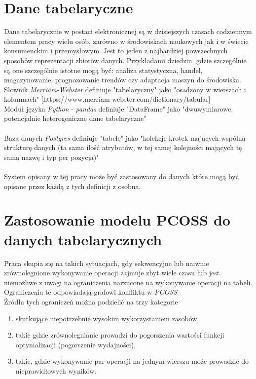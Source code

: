 \documentclass[brudnopis]{xmgr}
\begin{document}
\chapter{Dane tabelaryczne}

Dane tabelarycznie w postaci elektronicznej są w dzisiejszych czasach codziennym elementem pracy wielu osób, zarówno w środowiskach naukowych jak i w świecie konsumenckim i przemysłowym. Jest to jeden z najbardziej powszechnych sposobów reprezentacji zbiorów danych. Przykładami dziedzin, gdzie szczególnie są one szczególnie istotne mogą być: analiza statystyczna, handel, magazynowanie, prognozowanie trendów czy adaptacja maszyn do środowiska.
\medskip\\

Słownik \emph{Merriam-Webster} definiuje "tabelaryczny" jako "osadzony w wierszach i kolumnach" [https://www.merriam-webster.com/dictionary/tabular]
\medskip\\

Moduł języka \emph{Python} - \emph{pandas} definiuje "DataFrame" jako "dwuwymiarowe, potencjalnie heterogeniczne dane tabelaryczne" \\
[https://pandas.pydata.org/docs/reference/frame.html]
\medskip\\

Baza danych \emph{Postgres} definiuje "tabelę" jako "kolekcję krotek mających wspólną strukturę danych (ta sama ilość atrybutów, w tej samej kolejności mających tę samą nazwę i typ per pozycja)" \\
[https://www.postgresql.org/docs/13/glossary.html]
\medskip\\

System opisany w tej pracy może być zastosowany do danych które mogą być opisane przez każdą z tych definicji z osobna.

\chapter{Zastosowanie modelu PCOSS do danych tabelarycznych}

Praca skupia się na takich sytuacjach, gdy sekwencyjne lub naiwnie zrównolegnione wykonywanie operacji zajmuje zbyt wiele czasu lub jest niemożliwe z uwagi na ograniczenia narzucone na wykonywanie operacji na tabeli.
Ograniczenia te odpowiadają grafowi konfliktu w \emph{PCOSS}
\medskip\\

Źródła tych ograniczeń można podzielić na trzy kategorie
\begin{enumerate}
    \item skutkujące niepotrzebnie wysokim wykorzystaniem zasobów,
    \item takie gdzie zrównolegnianie prowadzi do pogorszenia wartości funkcji optymalizacji (pogorszenie wydajności),
    \item takie, gdzie wykonywanie par operacji na jednym wierszu może prowadzić do nieprawidłowych wyników.
\end{enumerate}
\medskip\\
\end{document}
